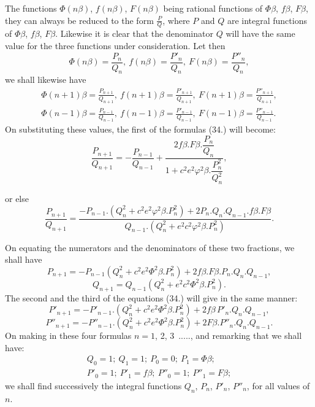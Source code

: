 \documentclass{article}
\begin{document}
The functions $\Phi(n\beta)$, $f(n\beta)$, $F(n\beta)$ being rational functions of $\Phi\beta$, $f\beta$, $F\beta$, they can always be reduced to the form $\frac{P}{Q}$, where $P$ and $Q$ are integral functions of $\Phi\beta$, $f\beta$, $F\beta$. Likewise it is clear that the denominator $Q$ will have the same value for the three functions under consideration. Let then
\[ \Phi(n\beta)=\frac{P_n}{Q_n},\ f(n\beta)=\frac{P'_n}{Q_n},\ F(n\beta)=\frac{P''_n}{Q_n}, \tag{35$'$.} \]
we shall likewise have
\[ \begin{gathered} \Phi(n+1)\beta=\frac{P_{n+1}}{Q_{n+1}},\ f(n+1)\beta=\frac{P'_{n+1}}{Q_{n+1}},\ F(n+1)\beta=\frac{P''_{n+1}}{Q_{n+1}},\\ \Phi(n-1)\beta=\frac{P_{n-1}}{Q_{n-1}},\ f(n-1)\beta=\frac{P'_{n-1}}{Q_{n-1}},\ F(n-1)\beta=\frac{P''_{n-1}}{Q_{n-1}}. \end{gathered} \]
On substituting these values, the first of the formulas (34.) will become:
\[ \frac{P_{n+1}}{Q_{n+1}}=-\frac{P_{n-1}}{Q_{n-1}}+\frac{2f\beta.F\beta.\dfrac{P_n}{Q_n}}{1+c^{2}e^{2}\varphi^{2}\beta.\dfrac{P_n^{2}}{Q_n^{2}}}, \]

or else
\[ \frac{P_{n+1}}{Q_{n+1}}=\frac{-P_{n-1}.(Q_n^{2}+c^{2}e^{2}\varphi^{2}\beta.P_n^{2})+2P_n.Q_n.Q_{n-1}.f\beta.F\beta}{Q_{n-1}.(Q_n^{2}+e^{2}c^{2}\varphi^{2}\beta.P_n^{2})}. \]

On equating the numerators and the denominators of these two fractions, we shall have
\[ P_{n+1}=-P_{n-1}(Q_n^{2}+c^{2}e^{2}\Phi^{2}\beta.P_n^{2})+2f\beta.F\beta.P_n.Q_n.Q_{n-1}, \tag{36.} \]
\[ Q_{n+1}=Q_{n-1}(Q_n^{2}+e^{2}c^{2}\Phi^{2}\beta.P_n^{2}). \tag{37.} \]
The second and the third of the equations (34.) will give in the same manner:
\[ P'_{n+1}=-P'_{n-1}.(Q_n^{2}+c^{2}e^{2}\Phi^{2}\beta.P_n^{2})+2f\beta\,P'_n.Q_n.Q_{n-1}, \tag{38.} \]
\[ P''_{n+1}=-P''_{n-1}.(Q_n^{2}+c^{2}e^{2}\Phi^{2}\beta.P_n^{2})+2F\beta.P''_n.Q_n.Q_{n-1}. \tag{39.} \]
On making in these four formulas $n=1$, 2, 3\ ....., and remarking that we shall have:
\[ \begin{gathered} Q_0=1;\ Q_1=1;\ P_0=0;\ P_1=\Phi\beta;\\ P'_0=1;\ P'_1=f\beta;\ P''_0=1;\ P''_1=F\beta; \end{gathered} \]
we shall find successively the integral functions $Q_n$, $P_n$, $P'_n$, $P''_n$, for all values of $n$.
\end{document}
